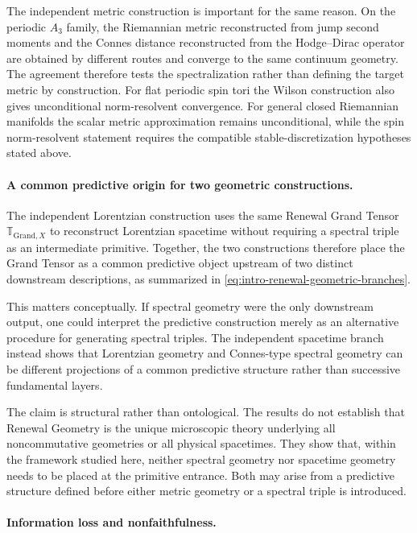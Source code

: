\documentclass[11pt]{article}
\theoremstyle{definition}
\theoremstyle{remark}
\theoremstyle{definition}
\theoremstyle{remark}
\newcommand{\GTX}{\boldsymbol{\mathbb T}_{\mathrm{Grand},X}}
\begin{document}
The independent metric construction is important for the same reason.  On the
periodic $A_3$ family, the Riemannian metric reconstructed from jump second moments
and the Connes distance reconstructed from the Hodge--Dirac operator are obtained
by different routes and converge to the same continuum geometry.  The agreement
therefore tests the spectralization rather than defining the target metric by
construction.  For flat periodic spin tori the Wilson construction also gives unconditional
norm-resolvent convergence.  For general closed Riemannian manifolds the scalar
metric approximation remains unconditional, while the spin norm-resolvent statement
requires the compatible stable-discretization hypotheses stated above.

\paragraph{A common predictive origin for two geometric constructions.}

The independent Lorentzian construction
\cite{PelissierRenewalSpacetime2026} uses the same Renewal Grand Tensor $\GTX$
to reconstruct Lorentzian spacetime without requiring a spectral triple as an
intermediate primitive.  Together, the two constructions therefore place the
Grand Tensor as a common predictive object upstream of two distinct downstream
descriptions, as summarized in
\eqref{eq:intro-renewal-geometric-branches}.

This matters conceptually.  If spectral geometry were the only downstream output,
one could interpret the predictive construction merely as an alternative
procedure for generating spectral triples.  The independent spacetime branch
instead shows that Lorentzian geometry and Connes-type spectral geometry can be
different projections of a common predictive structure rather than successive
fundamental layers.

The claim is structural rather than ontological.  The results do not establish
that Renewal Geometry is the unique microscopic theory underlying all
noncommutative geometries or all physical spacetimes.  They show that, within the
framework studied here, neither spectral geometry nor spacetime geometry needs to
be placed at the primitive entrance.  Both may arise from a predictive structure
defined before either metric geometry or a spectral triple is introduced.

\paragraph{Information loss and nonfaithfulness.}
\end{document}
